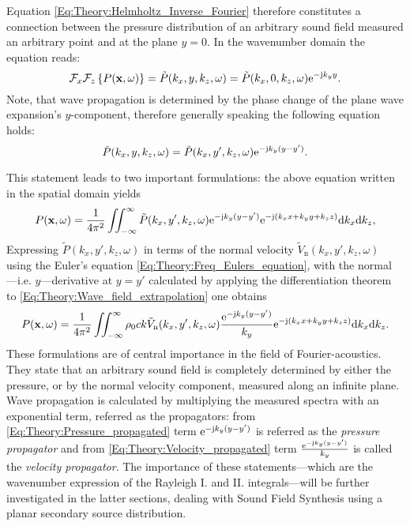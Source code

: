 Equation \eqref{Eq:Theory:Helmholtz_Inverse_Fourier} therefore constitutes a connection between the pressure distribution of an arbitrary sound field measured an arbitrary point and at the plane $y=0$. In the wavenumber domain the equation reads:
\begin{equation}
\mathcal{F}_x\mathcal{F}_z \left\{ P(\mathbf{x},\omega) \right\} = \tilde{P}(k_x,y,k_z,\omega) = \tilde{P}(k_x,0,k_z,\omega) \mathrm{e}^{-\mathrm{j} k_y y}.
\label{Eq:Theory:Wave_field_extrapolation}
\end{equation}
Note, that wave propagation is determined by the phase change of the plane wave expansion's $y$-component, therefore generally speaking the following equation holds:
\begin{equation}
\tilde{P}(k_x,y,k_z,\omega) = \tilde{P}(k_x,y',k_z,\omega) \mathrm{e}^{-\mathrm{j} k_y ( y - y' ) }.
\end{equation}

\vspace{3mm}
This statement leads to two important formulations:
the above equation written in the spatial domain yields
\begin{equation}
P(\mathbf{x},\omega) = \frac{1}{4\pi^2}\iint_{-\infty}^{\infty} \tilde{P}(k_x,y',k_z,\omega) \mathrm{e}^{-\mathrm{j} k_y ( y - y' ) }  \mathrm{e}^{- \mathrm{j} \left( k_x x + k_y y + k_z z \right) }
\mathrm{d} k_x\mathrm{d} k_z,
\label{Eq:Theory:Pressure_propagated}
\end{equation}
Expressing $\tilde{P}(k_x,y',k_z,\omega)$ in terms of the normal velocity $\tilde{V}_{\mathrm{n}}(k_x,y',k_z,\omega)$ using the Euler's equation  \eqref{Eq:Theory:Freq_Eulers_equation}, with the normal ---i.e. $y$---derivative at $y = y'$ calculated by applying the differentiation theorem to \eqref{Eq:Theory:Wave_field_extrapolation} one obtains
\begin{equation}
P(\mathbf{x},\omega) = \frac{1}{4\pi^2}\iint_{-\infty}^{\infty} \rho_0 c k \tilde{V}_{\mathrm{n}}(k_x,y',k_z,\omega) \frac{\mathrm{e}^{-\mathrm{j} k_y ( y - y' ) } }{k_y} \mathrm{e}^{- \mathrm{j} \left( k_x x + k_y y + k_z z \right) }
\mathrm{d} k_x\mathrm{d} k_z.
\label{Eq:Theory:Velocity_propagated}
\end{equation}
These formulations are of central importance in the field of Fourier-acoustics. They state that an arbitrary sound field is completely determined by either the pressure, or by the normal velocity component, measured along an infinite plane. Wave propagation is calculated by multiplying the measured spectra with an exponential term, referred as the propagators: from \eqref{Eq:Theory:Pressure_propagated} term $\mathrm{e}^{-\mathrm{j} k_y ( y - y' ) }$ is referred as the \emph{pressure propagator} and from \eqref{Eq:Theory:Velocity_propagated} term $\frac{\mathrm{e}^{-\mathrm{j} k_y ( y - y' ) } }{k_y}$ is called the \emph{velocity propagator}.
The importance of these statements---which are the wavenumber expression of the Rayleigh I. and II. integrals---will be further investigated in the latter sections, dealing with Sound Field Synthesis using a planar secondary source distribution.

